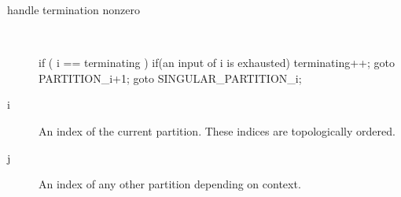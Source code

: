 \begin{description}
\begin{samepage}
\begin{code}
\end{code}
\end{samepage}
\item[handle termination nonzero] \ \ \ 
\begin{samepage}
\begin{code}
if ( i == terminating )                                   
{                                                          
  if(an input of i is exhausted)                  
  {                                                        
    terminating++;                                         
    goto PARTITION_i+1;                                
  }                                                        
  goto SINGULAR_PARTITION_i;
}   
\end{code}
\end{samepage}
  \item[i] An index of the current partition. These indices are topologically ordered.
  \item[j] An index of any other partition depending on context. 
\end{description}

